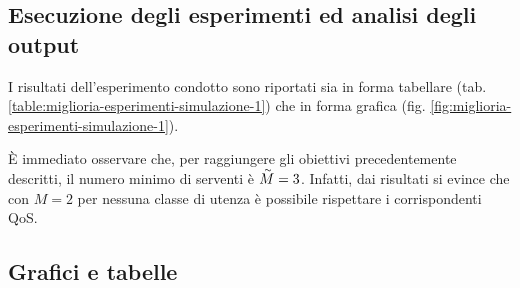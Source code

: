 \subsection{Esecuzione degli esperimenti ed analisi degli output}
I risultati dell'esperimento condotto sono riportati sia in forma tabellare (tab. \ref{table:miglioria-esperimenti-simulazione-1}) che in forma grafica (fig. \ref{fig:miglioria-esperimenti-simulazione-1}).

È immediato osservare che, per raggiungere gli obiettivi precedentemente descritti, il numero minimo di serventi è $\accentset{\sim}{M} = 3$. Infatti, dai risultati si evince che con $M = 2$ per nessuna classe di utenza è possibile rispettare i corrispondenti QoS.

\newpage

\subsection{Grafici e tabelle}
\captionsetup[table]{justification=centering}

